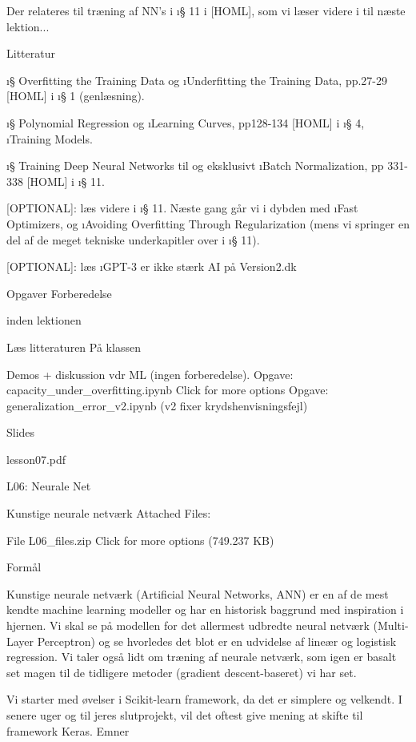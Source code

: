 Der relateres til træning af NN's i \i{§ 11} i [HOML], som vi læser videre i til
næste lektion...

Litteratur

\i{§ Overfitting the Training Data} og \i{Underfitting the Training Data},
pp.27-29 [HOML] i \i{§ 1} (genlæsning).

\i{§ Polynomial Regression} og \i{Learning Curves}, pp128-134 [HOML] i \i{§
4}, \i{Training Models}.

\i{§ Training Deep Neural Networks} til og eksklusivt \i{Batch Normalization},
pp 331-338 [HOML] i \i{§ 11}.

[OPTIONAL]: læs videre i \i{§ 11}.  Næste gang går vi i dybden med \i{Fast
Optimizers}, og \i{Avoiding Overfitting Through Regularization} (mens vi
springer en del af de meget tekniske underkapitler over i \i{§ 11}).

[OPTIONAL]: læs  \i{GPT-3 er ikke stærk AI} på Version2.dk

Opgaver Forberedelse

inden lektionen

Læs litteraturen
På klassen

        Demos + diskussion vdr ML (ingen forberedelse).
        Opgave:
            capacity_under_overfitting.ipynb Click for more options
        Opgave:
            generalization_error_v2.ipynb (v2 fixer krydshenvisningsfejl)

Slides

lesson07.pdf




L06: Neurale Net

Kunstige neurale netværk
Attached Files:

    File L06_files.zip Click for more options (749.237 KB)

Formål

Kunstige neurale netværk (Artificial Neural Networks, ANN) er en af de mest
kendte machine learning modeller og har en historisk baggrund med inspiration i
hjernen.  Vi skal se på modellen for det allermest udbredte neural netværk
(Multi-Layer Perceptron) og se hvorledes det blot er en udvidelse af lineær og
logistisk regression.  Vi taler også lidt om træning af neurale netværk, som
igen er basalt set magen til de tidligere metoder (gradient descent-baseret) vi
har set.

Vi starter med øvelser i Scikit-learn framework, da det er simplere og
velkendt.  I senere uger og til jeres slutprojekt, vil det oftest give mening
at skifte til framework Keras.  Emner

